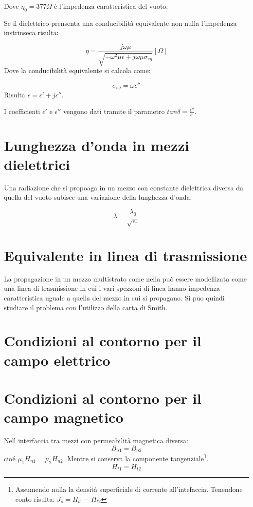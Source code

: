 \documentclass[10pt,a4paper]{report}
\begin{document}
		Dove $\eta_0=377\Omega$ è l'impedenza caratteristica del vuoto.

		Se il dielettrico prensenta una conducibilità equivalente non nulla l'impedenza instrinseca risulta:

		\begin{equation}
		\eta=\frac{j\omega\mu}{\sqrt{-\omega^2\mu\epsilon+j\omega\mu\sigma_{eq}}} [  \Omega  ]
		\end{equation}
		Dove la conducibilità equivalente si calcola come:

		\begin{equation}
		\sigma_{eq}=\omega \epsilon''
		\end{equation}
		Risulta $\epsilon=\epsilon'+j\epsilon''$.
		
		I coefficienti $\epsilon'$ e $\epsilon''$ vengono dati tramite il parametro $tan\delta=\frac{\epsilon''}{\epsilon'}$.

	\section{Lunghezza d'onda in mezzi dielettrici}
		Una radiazione che si propoaga in un mezzo con constante dielettrica diversa da quella del vuoto subisce una variazione della lunghezza d'onda:

		\begin{equation} 
		\lambda = \frac {\lambda_0} {\sqrt {\epsilon_r} }
		\end{equation} 

	\section{Equivalente in linea di trasmissione}

		
		La propagazione in un mezzo multistrato come nella può essere modellizata come una linea di trasmissione in cui i vari spezzoni di linea hanno impedenza caratteristica uguale a quella del mezzo in cui si propagano.	
		Si puo quindi studiare il problema con l'utilizzo della carta di Smith.

	\section{Condizioni al contorno per il campo elettrico}

	\section{Condizioni al contorno per il campo magnetico}
		Nell interfaccia tra mezzi con permeabilità magnetica diversa:
		\begin{equation}
		B_{n1}=B_{n2} 
		\end{equation}
		cioé $\mu_1 H_{n1} = \mu_2 H_{n2}$.
		Mentre si conserva la componente tangenziale\footnote{Assumendo nulla la densità superficiale di corrente all'intefaccia. Tenendone conto risulta: $J_s=H_{t1}-H_{t2}$}.
		\begin{equation}
		H_{t1}=H_{t2}
		\end{equation}
\end{document}
